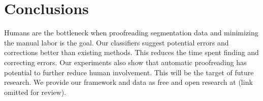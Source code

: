 \section{Conclusions}

Humans are the bottleneck when proofreading segmentation data and minimizing the manual labor is the goal. Our classifiers suggest potential errors and corrections better than existing methods. This reduces the time spent finding and correcting errors.
Our experiments also show that automatic proofreading has potential to further reduce human involvement. This will be the target of future research. We provide our framework and data as free and open research at (link omitted for review).%


